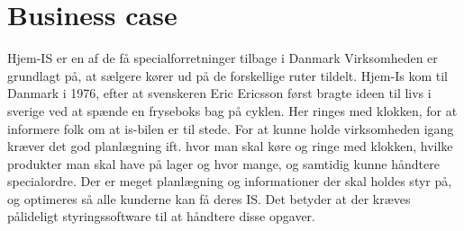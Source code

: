 \chapter{Business case}\label{ch:businesscase}
Hjem-IS er en af de få specialforretninger tilbage i Danmark
Virksomheden er grundlagt på, at sælgere kører ud på de forskellige ruter tildelt. Hjem-Is kom til Danmark i 1976, efter at svenskeren Eric Ericsson først bragte ideen til livs i sverige ved at spænde en fryseboks bag på cyklen.
Her ringes med klokken, for at informere folk om at is-bilen er til stede. For at kunne holde virksomheden igang kræver det god planlægning ift. hvor man skal køre og ringe med klokken, hvilke produkter man skal have på lager og hvor mange, og samtidig kunne håndtere specialordre. Der er meget planlægning og informationer der skal holdes styr på, og optimeres så alle kunderne kan få deres IS. Det betyder at der kræves pålideligt styringssoftware til at håndtere disse opgaver. 